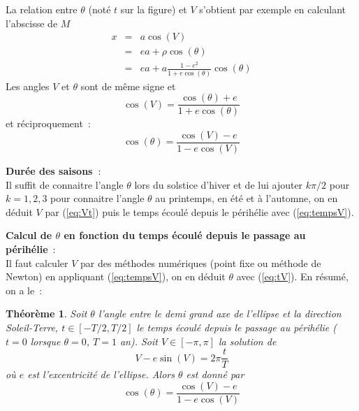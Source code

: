\documentclass[a4paper,11pt]{article}
\newtheorem{thm}{Théorème}
\begin{document}
\begin{giacjshere}
La relation entre $\theta$ (not\'e $t$ sur la figure)
et $V$ s'obtient par exemple en calculant 
l'abscisse de $M$ 
\begin{eqnarray*} 
x &= &a \cos(V) \\
 &= & ea + \rho \cos(\theta) \\
 &= & ea + a\frac{1-e^2}{1+e\cos(\theta)} \cos(\theta)
\end{eqnarray*}
Les angles $V$ et $\theta$ sont de même signe et
\begin{equation} \label{eq:Vt}
 \cos(V) = \frac{\cos(\theta)+e}{1+e\cos(\theta)}
\end{equation}
et réciproquement~:
\begin{equation} \label{eq:tV}
 \cos(\theta)=\frac{\cos(V)-e}{1-e \cos(V)} 
\end{equation}

{\bf Durée des saisons~}:\\
Il suffit de connaitre l'angle $\theta$ lors du solstice d'hiver et
de lui ajouter $k\pi/2$ pour $k=1,2,3$ pour connaitre l'angle $\theta$
au printemps, en été et à l'automne, on en déduit $V$ par (\ref{eq:Vt}) 
puis le temps écoulé depuis le p\'erihélie avec (\ref{eq:tempsV}).

{\bf Calcul de $\theta$ en fonction du temps écoulé depuis le passage
au p\'erihélie}~:\\
Il faut calculer $V$ par des méthodes numériques (point fixe ou 
méthode de Newton) en appliquant (\ref{eq:tempsV}), on en déduit
$\theta$ avec (\ref{eq:tV}).
En résumé, on a le~:
\begin{thm}
Soit $\theta$ l'angle entre le demi grand axe de l'ellipse et 
la direction Soleil-Terre, $t\in [-T/2,T/2]$ le temps écoulé depuis le passage
au périhélie ($t=0$ lorsque $\theta=0$, $T=1$ an). Soit $V\in [-\pi,\pi]$ 
la solution de 
\[  V - e \sin(V) = 2\pi \frac{t}{T} \]
où $e$ est l'excentricité de l'ellipse.
Alors $\theta$ est donné par
\[  \cos(\theta)=\frac{\cos(V)-e}{1-e \cos(V)}  \]
\end{thm}


\end{giacjshere}
\end{document}
